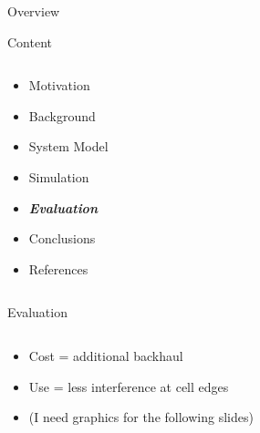 \documentclass[xcolor={cmyk}]{beamer}
\begin{document}
\begin{frame}{Overview}
	\begin{block}{Content}
		\begin{columns}
			\begin{column}{.9\textwidth}
				\begin{itemize}
					\item Motivation
					\item Background
					\item System Model
					\item Simulation
					\item \textbf{\emph{Evaluation}}
					\item Conclusions
					\item References
				\end{itemize}
			\end{column}
		\end{columns}
	\end{block}
\end{frame}
 
 \begin{frame}{Evaluation}
	 \begin{block}{}
	 	\begin{columns}
			\begin{column}{.9\textwidth}
				\begin{itemize}
					\item Cost = additional backhaul
					\item Use = less interference at cell edges
					\item (I need graphics for the following slides)
				\end{itemize}
			\end{column}
		\end{columns}
	 \end{block}
 \end{frame}
 
\end{document}
